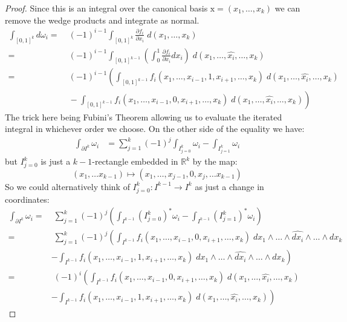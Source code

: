 \begin{proof}



Since this is an integral over the canonical basis $\text{x} = (x_1, \ldots, x_k)$ we can remove the wedge products and
integrate as normal.
\begin{align*}
	\int_{[0,1]^k} d\omega_i
		=&\; (-1)^{i-1} \int_{[0,1]^k} \frac{\partial f_i}{\partial x_i}\; d(x_1, \ldots, x_k) \\
		=&\; (-1)^{i-1} \int_{[0,1]^{k-1}} \left( \int_0^1 \frac{\partial f_i}{\partial x_i} dx_i \right) 
			\;d(x_1, \ldots, \widehat{x_i}, \ldots, x_k)\\
		=&\; (-1)^{i-1}\left( \int_{[0,1]^{k-1}} f_i(x_1, \ldots, x_{i-1}, 1, x_{i+1}, \ldots, x_k)
			\;d(x_1, \ldots, \widehat{x_i}, \ldots, x_k) \right.\\
		&\;	- \left. \int_{[0,1]^{k-1}} f_i(x_1, \ldots, x_{i-1}, 0, x_{i+1}, \ldots, x_k)
			\;d(x_1, \ldots, \widehat{x_i}, \ldots, x_k) \right)
\end{align*}
The trick here being Fubini's Theorem allowing us to evaluate the iterated integral in whichever order we choose.
On the other side of the equality we have:
\begin{align*}
	\int_{\partial I^k} \omega_i
		&= \sum_{j=1}^k (-1)^j \int_{I^k_{j=0}} \omega_i - \int_{I^k_{j=1}} \omega_i
\end{align*}
but $I^k_{j=0}$ is just a $k-1$-rectangle embedded in $\mathbb{R}^k$ by the map:
\begin{equation*}
	(x_1, \ldots x_{k-1}) \mapsto (x_1, \ldots, x_{j-1}, 0, x_{j}, \ldots x_{k-1})
\end{equation*}
So we could alternatively think of $I^k_{j=0}: I^{k-1} \to I^k$ as just a change in coordinates:
\begin{align*}
	\int_{\partial I^k} \omega_i 
		=&\; \sum_{j=1}^k (-1)^j 
			\left(\int_{I^{k-1}} (I^k_{j=0})^*\omega_i - \int_{I^{k-1}} (I^k_{j=1})^* \omega_i \right) \\
		=&\; \sum_{j=1}^k (-1)^j 
			\left(\int_{I^{k-1}} f_i (x_1, \ldots, x_{i-1}, 0, x_{i+1}, \ldots, x_k)
				\;dx_1 \wedge \ldots \wedge \widehat{dx_i} \wedge  \ldots \wedge dx_k \right. \\
		&	\left. - \int_{I^{k-1}} f_i (x_1, \ldots, x_{i-1}, 1, x_{i+1}, \ldots, x_k)
				\;dx_1 \wedge \ldots \wedge \widehat{dx_i} \wedge  \ldots \wedge dx_k \right)\\
		=&\; (-1)^i \left(\int_{I^{k-1}} f_i (x_1, \ldots, x_{i-1}, 0, x_{i+1}, \ldots, x_k)
				\;d(x_1, \ldots,\widehat{x_i},  \ldots, x_k) \right. \\
		&	\left. - \int_{I^{k-1}} f_i (x_1, \ldots, x_{i-1}, 1, x_{i+1}, \ldots, x_k)
				\;d(x_1, \ldots,\widehat{x_i},  \ldots, x_k) \right)
\end{align*}




\end{proof}
